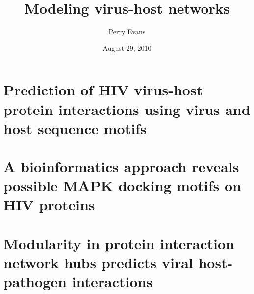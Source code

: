 \documentclass[12pt]{report}%
\begin{document}

  \clearpage

  \title{Modeling virus-host networks}

  \author{Perry Evans}
  \date{August 29, 2010}



  \beforepreface
  

  \clearpage
  \abstractp

  

  \clearpage

  \tableofcontents

  \tablespagetrue
  \listoftables
  \figurespagetrue
  \listoffigures



  \clearpage

  
  \chapter{Prediction of HIV virus-host protein interactions using virus and host sequence motifs} \label{chapter:predict}
  
\chapter{A bioinformatics approach reveals possible MAPK docking motifs on HIV proteins} \label{chapter:mapk}
  
  \chapter{Modularity in protein interaction network hubs predicts viral host-pathogen interactions} \label{chapter:hubs}
   


  \appendix
  


  
  
\end{document}
